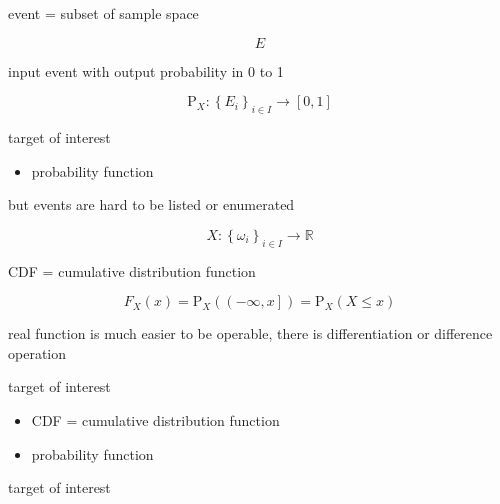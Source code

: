 \documentclass[
]{book}
\providecommand{\tightlist}{%
  \setlength{\itemsep}{0pt}\setlength{\parskip}{0pt}}
\theoremstyle{definition}
\theoremstyle{definition}
\theoremstyle{definition}
\theoremstyle{definition}
\theoremstyle{remark}
\begin{document}
event = subset of sample space

\[
E
\]

input event with output probability in 0 to 1

\[
\mathrm{P}_{{\scriptscriptstyle X}}:\left\{ E_{{\scriptscriptstyle i}}\right\} _{{\scriptscriptstyle i\in I}}\rightarrow\left[0,1\right]
\]

target of interest

\begin{itemize}
\tightlist
\item
  probability function
\end{itemize}

but events are hard to be listed or enumerated

\[
X:\left\{ \omega_{{\scriptscriptstyle i}}\right\} _{{\scriptscriptstyle i}\in I}\rightarrow\mathbb{R}
\]

CDF = cumulative distribution function

\[
F_{{\scriptscriptstyle X}}\left(x\right)=\mathrm{P}_{{\scriptscriptstyle X}}\left(\left(-\infty,x\right]\right)=\mathrm{P}_{{\scriptscriptstyle X}}\left(X\le x\right)
\]

real function is much easier to be operable, there is differentiation or difference operation

target of interest

\begin{itemize}
\tightlist
\item
  CDF = cumulative distribution function
\item
  probability function
\end{itemize}

target of interest
\end{document}
